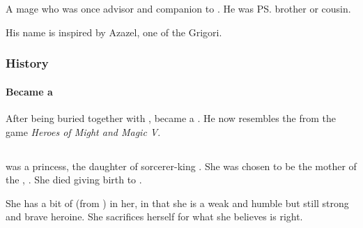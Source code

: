 \chapter{\Nephilim}















\section{\Eshayzal}
\index{\Eshayzal}
A \nephil{} mage who was once advisor and companion to . 
He was \ps{\Semiza} brother or cousin. 

His name is inspired by Azazel, one of the Grigori. 








\subsection{History}
\subsubsection{Became a \Lich}
After being buried together with \Semiza, \Eshayzal{} became a \Lich. 
He now resembles the \Liches{} from the game \emph{Heroes of Might and Magic V}. 















\section{\Ilu}
\index{\Ilu}
\Ilu{} was a \nephil{} princess, the daughter of sorcerer-king . 
She was chosen to be the mother of the , . 
She died giving birth to \Thanatzil. 

She has a bit of \PhedreNoDelaunay{} (from ) in her, in that she is a weak and humble but still strong and brave heroine. 
She sacrifices herself for what she believes is right. 









